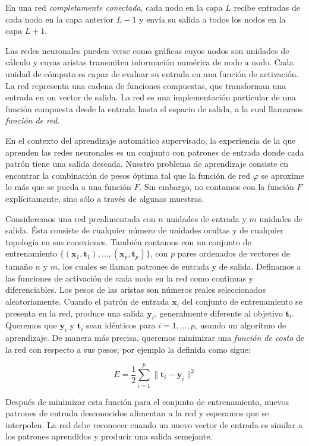 \begin{remark}
En una red \textit{completamente conectada}, cada nodo en la capa $L$
recibe entradas de cada nodo en la capa anterior $L-1$ y envía su salida
a todos los nodos en la capa $L+1$.
\end{remark}

Las redes neuronales pueden verse como
gráficas cuyos nodos son unidades de cálculo y cuyas aristas
transmiten información numérica de nodo a nodo. Cada unidad de cómputo es capaz de evaluar su entrada
en una función de activación. La red representa una cadena de funciones compuestas,
que transforman una entrada en un vector de salida. La red es una implementación
particular de una función compuesta desde la entrada hasta el espacio de salida,
a la cual llamamos \textit{función de red}.

En el contexto del aprendizaje automático supervisado,
la experiencia de la que aprenden las redes neuronales es un conjunto 
con patrones de entrada donde cada patrón tiene una salida deseada.
Nuestro problema de aprendizaje consiste
en encontrar la combinación de pesos óptima tal que la función de red 
$\varphi$ se aproxime lo más que se pueda a una función $F$. Sin embargo,
no contamos con la función $F$ explícitamente, sino sólo a través de algunas muestras.

Consideremos una red prealimentada 
con $n$ unidades de entrada y $m$
unidades de salida. Ésta consiste de cualquier número de unidades ocultas
y de cualquier topología en sus conexiones. También contamos
con un conjunto de entrenamiento 
$\{(\mathbf{x}_1, \mathbf{t}_1), \dots, (\mathbf{x}_p, \mathbf{t}_p)\}$, con $p$ pares ordenados de vectores de tamaño $n$ y $m$, los cuales se llaman patrones de entrada y de salida.
Definamos a las funciones de activación de cada nodo en la red como
continuas y diferenciables. Los pesos de las aristas son números reales 
seleccionados aleatoriamente. Cuando el patrón de entrada $\mathbf{x}_i$
del conjunto de entrenamiento se presenta en la red, produce una salida 
$\mathbf{y}_i$, generalmente diferente al objetivo $\mathbf{t}_i$.
Queremos que $\mathbf{y}_i$ y $\mathbf{t}_i$ sean idénticos para
$i = 1, \dots, p$, usando un algoritmo de aprendizaje. De manera
más precisa, queremos minimizar una \textit{función de costo} de la red
con respecto a sus pesos;
por ejemplo la definida como sigue:

\[
E = \frac{1}{2} \sum_{i=1}^p \|\mathbf{t}_i - \mathbf{y}_i\|^2
\]


Después de minimizar esta función para el conjunto de entrenamiento, nuevos patrones 
de entrada desconocidos alimentan a la red y esperamos que se interpolen. La red debe reconocer
cuando un nuevo vector de entrada es similar a los patrones aprendidos y producir una salida 
semejante.


